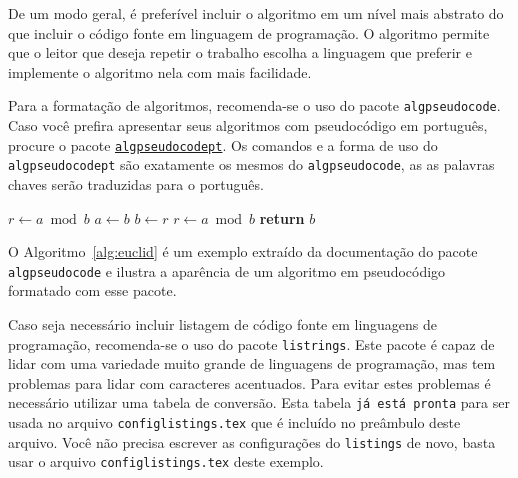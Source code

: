\documentclass[times,english,brazilian,oneside,section=TITLE]{ifes8}
\begin{document}
De um modo geral, é preferível incluir o algoritmo em um nível mais abstrato
do que incluir o código fonte em linguagem de programação. O algoritmo permite
que o leitor que deseja repetir o trabalho escolha a linguagem que preferir e
implemente o algoritmo nela com mais facilidade.

Para a formatação de algoritmos, recomenda-se o uso do pacote
\texttt{algpseudocode}. Caso você prefira apresentar seus algoritmos com
pseudocódigo em português, procure o pacote
\href{https://github.com/quigonjeff/algpseudocodept}{\texttt{algpseudocodept}}.
Os comandos e a forma de uso do \texttt{algpseudocodept} são exatamente os
mesmos do \texttt{algpseudocode}, as as palavras chaves serão traduzidas para o
português.

\begin{algorithm}
  \caption{Euclid’s algorithm}
  \label{alg:euclid}
  \begin{algorithmic}[1]
    \State $r\gets a\bmod b$
      \State $a\gets b$
      \State $b\gets r$
      \State $r\gets a\bmod b$
    \EndWhile\label{euclidendwhile}
    \State \textbf{return} $b$
    \EndProcedure
  \end{algorithmic}
\end{algorithm}

O Algoritmo~\ref{alg:euclid} é um exemplo extraído da documentação do pacote
\texttt{algpseudocode} e ilustra a aparência de um algoritmo em pseudocódigo
formatado com esse pacote.

Caso seja necessário incluir listagem de código fonte em linguagens de
programação, recomenda-se o uso do pacote \texttt{listrings}. Este pacote
é capaz de lidar com uma variedade muito grande de linguagens de programação,
mas tem problemas para lidar com caracteres acentuados. Para evitar estes
problemas é necessário utilizar uma tabela de conversão. Esta tabela \texttt{já
  está pronta} para ser usada no arquivo \texttt{configlistings.tex} que é
incluído no preâmbulo deste arquivo. Você não precisa escrever as configurações
do \texttt{listings} de novo, basta usar o arquivo \texttt{configlistings.tex}
deste exemplo.
\end{document}
